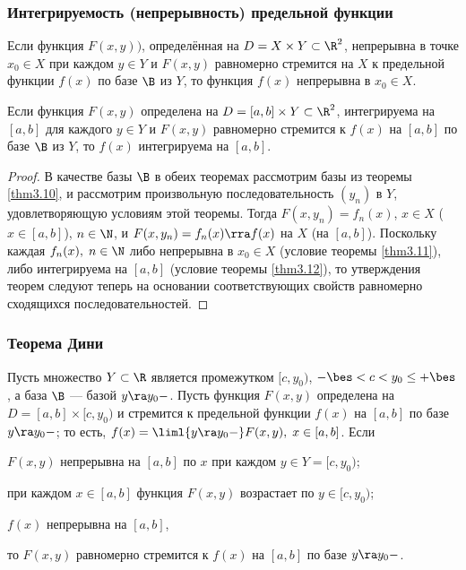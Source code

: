 \documentclass[a4paper]{article}
\begin{document}
\subsubsection{Интегрируемость (непрерывность) предельной функции}
\begin{theorem}\label{thm3.11}
Если функция $F(x,y))$, определённая на $D=X\times Y\subset\R^2$,
непрерывна в точке $x_0\in X$ при каждом $y\in Y$ и $F(x,y)$
равномерно стремится на $X$ к предельной функции $f(x)$ по базе $\B$
из $Y$, то функция $f(x)$ непрерывна в $x_0\in X$.
\end{theorem}

\begin{theorem}\label{thm3.12}
Если функция $F(x,y)$ определена на $D=[a,b]\times Y\subset\R^2$,
интегрируема на $[a,b]$ для каждого $y\in Y$ и $F(x,y)$ равномерно
стремится к $f(x)$ на $[a,b]$ по базе $\B$ из $Y$, то $f(x)$
интегрируема на $[a,b]$.
\end{theorem}

\begin{proof}
В качестве базы $\B$ в обеих теоремах рассмотрим базы из теоремы
\ref{thm3.10}, и рассмотрим произвольную последовательность $(y_n)$
в $Y$, удовлетворяющую условиям этой теоремы. Тогда $F(x,y_n) =
f_n(x)$, $x\in X$ ($x\in[a,b]$), $n\in\N$, и $F(x,y_n) = f_n(x) \rra
f(x)$ на $X$ (на $[a,b]$). Поскольку каждая $f_n(x), \; n\in\N$ либо
непрерывна в $x_0\in X$ (условие теоремы \ref{thm3.11}), либо
интегрируема на $[a,b]$ (условие теоремы \ref{thm3.12}), то
утверждения теорем следуют теперь на основании соответствующих
свойств равномерно сходящихся последовательностей.
\end{proof}

\subsubsection{Теорема Дини}

\begin{theorem}
Пусть множество $Y\subset\R$ является промежутком $[c,y_0)$,
$-\bes<c<y_0\le+\bes$, а база $\B$ --- базой $y\ra y_0-$. Пусть
функция $F(x,y)$ определена на $D=[a,b]\times[c,y_0)$ и стремится к
предельной функции $f(x)$ на $[a,b]$ по базе $y\ra y_0-$; то есть,
$f(x)=\liml{y\ra y_0-} F(x,y), \; x\in[a,b]$. Если \begin{nums}{-2}
\item $F(x,y)$ непрерывна на $[a,b]$ по $x$ при каждом $y\in
Y=[c,y_0)$;
\item при каждом $x\in[a,b]$ функция $F(x,y)$ возрастает по
$y\in[c,y_0)$; \item $f(x)$ непрерывна на $[a,b]$,\end{nums} то
$F(x,y)$ равномерно стремится к $f(x)$ на $[a,b]$ по базе $y\ra
y_0-$.
\end{theorem}
\end{document}
